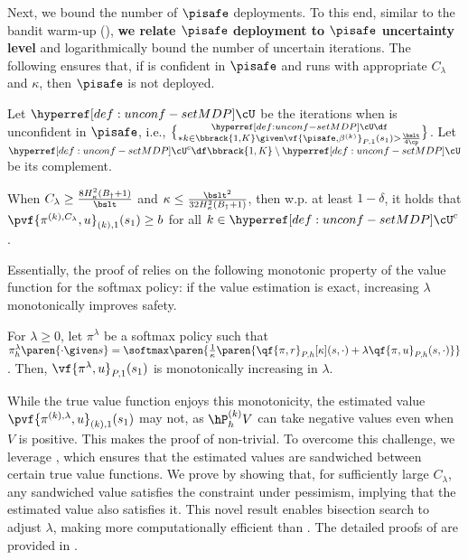 Next, we bound the number of $\pisafe$ deployments.
To this end, similar to the bandit warm-up (), \textbf{we relate $\boldsymbol{\pisafe}$ deployment to $\boldsymbol{\pisafe}$ uncertainty level} and logarithmically bound the number of uncertain iterations.
The following  ensures that, if  is confident in $\pisafe$ and runs with appropriate $C_\lambda$ and $\kappa$, then $\pisafe$ is not deployed.
\begin{definition}\label{def:unconf-set MDP}
Let $\unconfMDP$ be the iterations when  is unconfident in $\pisafe$, i.e., 
$
\unconfMDP \df 
\brace*{k \in \bbrack{1, K} \given 
\vf{\pisafe, \beta^{(k)}}_{P, 1}(s_1) > \frac{\bslt}{4\cp}
}
$.
Let $\unconfMDP^c \df \bbrack{1, K} \setminus \unconfMDP$ be its complement.
\end{definition}
\begin{lemma}\label{lemma:trigger-condition-main}
When $C_\lambda \geq \frac{8H_\kappa^2 (B_\dagger + 1)}{\bslt}$ and $\kappa \leq \frac{\bslt^2}{32H_\kappa^2 (B_\dagger + 1)}$, then w.p. at least $1-\delta$, it holds that $\pvf{\pi^{(k), C_\lambda}, u}_{(k), 1}(s_1) \geq b$ for all $k \in \unconfMDP^c$.
\end{lemma}
Essentially, the proof of  relies on the following monotonic property of the value function for the softmax policy: if the value estimation is exact, increasing $\lambda$ monotonically improves safety.
\begin{lemma}\label{lemma:softmax-value-monotonicity-main}
For $\lambda \geq 0$, let $\pi^\lambda$ be a softmax policy such that 
\(
\pi^\lambda_h \paren{\cdot \given s} = \softmax\paren{\frac{1}{\kappa}\paren{
    \qf{\pi, r}_{P, h}[\kappa](s, \cdot)
    + \lambda \qf{\pi, u}_{P, h}(s, \cdot)}}
\).
Then, \(\vf{\pi^\lambda, u}_{P, 1}(s_1)\) is monotonically increasing in $\lambda$.
\end{lemma}
While the true value function enjoys this monotonicity, the estimated value $\pvf{\pi^{(k), \lambda}, u}_{(k), 1}(s_1)$ may not, as $\hP^{(k)}_h V$ can take negative values even when $V$ is positive. 
This makes the proof of  non-trivial.
To overcome this challenge, we leverage , which ensures that the estimated values are sandwiched between certain true value functions.
We prove  by showing that, for sufficiently large $C_\lambda$, any sandwiched value satisfies the constraint under pessimism, implying that the estimated value also satisfies it.
This novel result enables bisection search to adjust $\lambda$, making \MDPalgo more computationally efficient than \citet{ghosh2024towards}.
The detailed proofs of  are provided in .



